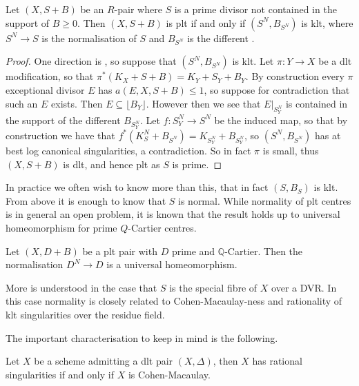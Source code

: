\documentclass[a4paper,12pt]{book}
\begin{document}
\begin{theorem}
	Let $(X,S+B)$ be an $R$-pair where $S$ is a prime divisor not contained in the support of $B \geq 0$. Then $(X,S+B)$ is plt if and only if $(S^{N},B_{S^{N}})$ is klt, where $S^{N} \to S$ is the normalisation of $S$ and $B_{S^{N}}$ is the different \cite{}. 
\end{theorem}

\begin{proof}
	One direction is \cite{}, so suppose that $(S^{N},B_{S^{N}})$ is klt. Let $\pi:Y \to X$ be a dlt modification, so that $\pi^{*}(K_{X}+S+B)=K_{Y}+S_{Y}+B_{Y}$. By construction every $\pi$ exceptional divisor $E$ has $a(E,X,S+B) \leq 1$, so suppose for contradiction that such an $E$ exists. Then $E \subseteq \lfloor B_{Y} \rfloor$. However then we see that $E|_{S_{Y}^{N}}$ is contained in the support of the different $B_{S_{Y}^{N}}$. Let $f:S_{Y}^{N} \to S^{N}$ be the induced map, so that by construction we have that $f^{*}(K_{S}^{N}+B_{S^{N}})=K_{S_{Y}^{N}}+B_{S_{Y}^{N}}$, so $(S^{N},B_{S^{N}})$ has at best log canonical singularities, a contradiction. So in fact $\pi$ is small, thus $(X,S+B)$ is dlt, and hence plt as $S$ is prime.
\end{proof}

In practice we often wish to know more than this, that in fact $(S,B_{S})$ is klt. From above it is enough to know that $S$ is normal. While normality of plt centres is in general an open problem, it is known that the result holds up to universal homeomorphism for prime $Q$-Cartier centres.

\begin{lemma}\cite[Lemma 2.1]{hacon2020relative}\label{plt-universal}
	
	Let $(X,D+B)$ be a plt pair with $D$ prime and $\mathbb{Q}$-Cartier. Then the normalisation $D^{N} \to D$ is a universal homeomorphism.
	
	\end{lemma}

More is understood in the case that $S$ is the special fibre of $X$ over a DVR. In this case normality is closely related to Cohen-Macaulay-ness and rationality of klt singularities over the residue field.

The important characterisation to keep in mind is the following.

\begin{theorem}
	Let $X$ be a scheme admitting a dlt pair $(X,\Delta)$, then $X$ has rational singularities if and only if $X$ is Cohen-Macaulay.
\end{theorem}
\end{document}
